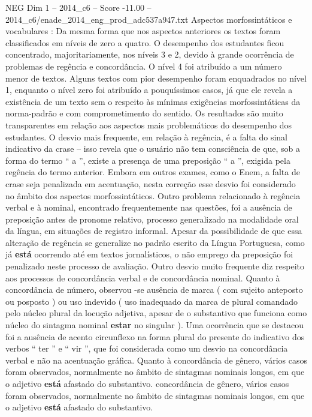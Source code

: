 \begin{textsample}{NEG Dim 1 – 2014\_c6 – Score -11.00 – 2014\_c6/enade\_2014\_eng\_prod\_adc537a947.txt}
Aspectos morfossintáticos e vocabulares : Da mesma forma que nos aspectos anteriores os textos foram classificados em níveis de zero a quatro.
O desempenho dos estudantes ficou concentrado, majoritariamente, nos níveis 3 e 2, devido à grande ocorrência de problemas de regência e concordância.
O nível 4 foi atribuído a um número menor de textos.
Alguns textos com pior desempenho foram enquadrados no nível 1, enquanto o nível zero foi atribuído a pouquíssimos casos, já que ele revela a existência de um texto sem o respeito às mínimas exigências morfossintáticas da norma-padrão e com comprometimento do sentido.
Os resultados são muito transparentes em relação aos aspectos mais problemáticos do desempenho dos estudantes.
O desvio mais frequente, em relação à regência, é a falta do sinal indicativo da crase – isso revela que o usuário não tem consciência de que, sob a forma do termo “ a ”, existe a presença de uma preposição “ a ”, exigida pela regência do termo anterior.
Embora em outros exames, como o Enem, a falta de crase seja penalizada em acentuação, nesta correção esse desvio foi considerado no âmbito dos aspectos morfossintáticos.
Outro problema relacionado à regência verbal e à nominal, encontrado frequentemente nas questões, foi a ausência de preposição antes de pronome relativo, processo generalizado na modalidade oral da língua, em situações de registro informal.
Apesar da possibilidade de que essa alteração de regência se generalize no padrão escrito da Língua Portuguesa, como já \textbf{está} ocorrendo até em textos jornalísticos, o não emprego da preposição foi penalizado neste processo de avaliação.
Outro desvio muito frequente diz respeito aos processos de concordância verbal e de concordância nominal.
Quanto à concordância de número, observou -se ausência de marca ( com sujeito anteposto ou posposto ) ou uso indevido ( uso inadequado da marca de plural comandado pelo núcleo plural da locução adjetiva, apesar de o substantivo que funciona como núcleo do sintagma nominal \textbf{estar} no singular ).
Uma ocorrência que se destacou foi a ausência de acento circunflexo na forma plural do presente do indicativo dos verbos “ ter ” e “ vir ”, que foi considerada como um desvio na concordância verbal e não na acentuação gráfica.
Quanto à concordância de gênero, vários casos foram observados, normalmente no âmbito de sintagmas nominais longos, em que o adjetivo \textbf{está} afastado do substantivo. concordância de gênero, vários casos foram observados, normalmente no âmbito de sintagmas nominais longos, em que o adjetivo \textbf{está} afastado do substantivo.

\end{textsample}
